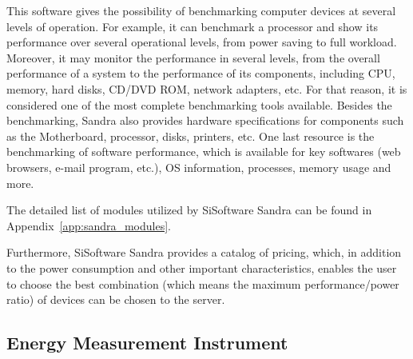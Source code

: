     This software gives the possibility of benchmarking computer devices at several levels of operation. For example, it can benchmark a processor and show its performance over several operational levels, from power saving to full workload. Moreover, it may monitor the performance in several levels, from the overall performance of a system to the performance of its components, including CPU, memory, hard disks, CD/DVD ROM, network adapters, etc. For that reason, it is considered one of the most complete benchmarking tools available. Besides the benchmarking, Sandra also provides hardware specifications for components such as the Motherboard, processor, disks, printers, etc. One last resource is the benchmarking of software performance, which is available for key softwares (web browsers, e-mail program, etc.), OS information, processes, memory usage and more.
    
    The detailed list of modules utilized by SiSoftware Sandra can be found in Appendix~\ref{app:sandra_modules}.
    
    Furthermore, SiSoftware Sandra provides a catalog of pricing, which, in addition to the power consumption and other important characteristics, enables the user to choose the best combination (which means the maximum performance/power ratio) of devices can be chosen to the server.
    
    \subsection{Energy Measurement Instrument} \label{sec3:energy_measurement_instrument}

